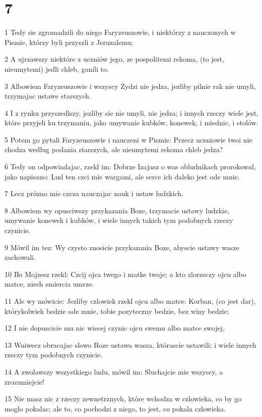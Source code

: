 \chapter{7}

\par 1 Tedy sie zgromadzili do niego Faryzeuszowie, i niektórzy z nauczonych w Pismie, którzy byli przyszli z Jeruzalemu;
\par 2 A ujrzawszy niektóre z uczniów jego, ze pospolitemi rekoma, (to jest, nieumytemi) jedli chleb, ganili to.
\par 3 Albowiem Faryzeuszowie i wszyscy Zydzi nie jedza, jezliby pilnie rak nie umyli, trzymajac ustawe starszych.
\par 4 I z rynku przyszedlszy, jezliby sie nie umyli, nie jedza; i innych rzeczy wiele jest, które przyjeli ku trzymaniu, jako umywanie kubków, konewek, i miednic, i stolów.
\par 5 Potem go pytali Faryzeuszowie i nauczeni w Pismie: Przecz uczniowie twoi nie chodza wedlug podania starszych, ale nieumytemi rekoma chleb jedza?
\par 6 Tedy on odpowiadajac, rzekl im: Dobrze Izajasz o was obludnikach prorokowal, jako napisano: Lud ten czci mie wargami, ale serce ich daleko jest ode mnie.
\par 7 Lecz prózno mie czcza nauczajac nauk i ustaw ludzkich.
\par 8 Albowiem wy opusciwszy przykazania Boze, trzymacie ustawy ludzkie, umywanie konewek i kubków, i wiele innych takich tym podobnych rzeczy czynicie.
\par 9 Mówil im tez: Wy czysto znosicie przykazania Boze, abyscie ustawy wasze zachowali.
\par 10 Bo Mojzesz rzekl: Czcij ojca twego i matke twoje; a kto zlorzeczy ojcu albo matce, niech smiercia umrze.
\par 11 Ale wy mówicie: Jezliby czlowiek rzekl ojcu albo matce: Korban, (co jest dar), którykolwiek bedzie ode mnie, tobie pozyteczny bedzie, bez winy bedzie;
\par 12 I nie dopuscicie mu nic wiecej czynic ojcu swemu albo matce swojej,
\par 13 Wniwecz obracajac slowo Boze ustawa wasza, którascie ustawili; i wiele innych rzeczy tym podobnych czynicie.
\par 14 A zwolawszy wszystkiego ludu, mówil im: Sluchajcie mie wszyscy, a zrozumiejcie!
\par 15 Nie masz nic z rzeczy zewnetrznych, które wchodza w czlowieka, co by go moglo pokalac; ale to, co pochodzi z niego, to jest, co pokala czlowieka.
